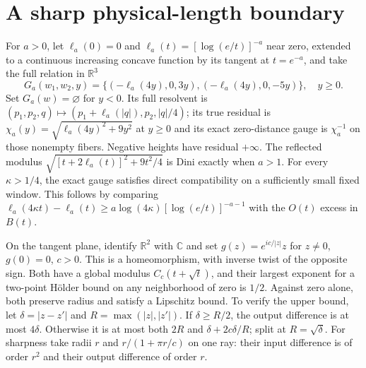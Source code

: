 \documentclass[11pt]{article}
\theoremstyle{remark}
\begin{document}
\section{A sharp physical-length boundary}
For $a>0$, let $\ell_a(0)=0$ and $\ell_a(t)=[\log(e/t)]^{-a}$ near zero, extended to a continuous
increasing concave function by its tangent at $t=e^{-a}$, and take
the full relation in $\mathbb R^3$
\begin{equation}
 G_a(w_1,w_2,y)=\{(-\ell_a(4y),0,3y),(-\ell_a(4y),0,-5y)\},\quad y\ge0.
\end{equation}
Set $G_a(w)=\varnothing$ for $y<0$.
Its full resolvent is $(p_1,p_2,q)\mapsto
(p_1+\ell_a(|q|),p_2,|q|/4)$; its true residual is
$\chi_a(y)=\sqrt{\ell_a(4y)^2+9y^2}$ at $y\ge0$ and its exact zero-distance gauge
is $\chi_a^{-1}$ on those nonempty fibers. Negative heights have residual
$+\infty$. The reflected modulus
$\sqrt{[t+2\ell_a(t)]^2+9t^2/4}$ is Dini exactly when $a>1$.
For every $\kappa>1/4$, the exact gauge satisfies direct compatibility
on a sufficiently small fixed window. This follows by comparing
$\ell_a(4\kappa t)-\ell_a(t)\ge
a\log(4\kappa)[\log(e/t)]^{-a-1}$ with the $O(t)$ excess in $B(t)$.

On the tangent plane, identify $\mathbb R^2$ with $\mathbb C$ and set
$g(z)=e^{ic/|z|}z$ for $z\ne0$, $g(0)=0$, $c>0$. This is a
homeomorphism, with inverse twist of the opposite sign. Both have a
global modulus $C_c(t+\sqrt t)$, and their largest exponent for a two-point
H\"older bound on any neighborhood of zero is $1/2$. Against zero alone,
both preserve radius and satisfy a Lipschitz bound. To verify the upper bound, let
$\delta=|z-z'|$ and $R=\max(|z|,|z'|)$. If $\delta\ge R/2$,
the output difference is at most $4\delta$. Otherwise it is at most
both $2R$ and $\delta+2c\delta/R$; split at $R=\sqrt\delta$.
For sharpness take radii $r$ and $r/(1+\pi r/c)$ on one ray: their
input difference is of order $r^2$ and their output difference of
order $r$.
\end{document}
